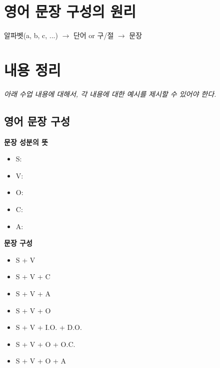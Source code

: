 \documentclass[11pt, twocolumn, a4paper]{oblivoir}
\begin{document}
    \chapter*{영어 문장 구성의 원리}

    
    알파벳(a, b, c, ...) $\rightarrow$ 단어 or 구/절 $\rightarrow$ 문장
    
    \chapter*{내용 정리}
   
  \noindent  \emph{아래 수업 내용에 대해서, 각 내용에 대한 예시를 제시할 수 있어야 한다. }

    \section*{영어 문장 구성}

    \textbf{문장 성분의 뜻}
    \begin{itemize}
        \item S:
        \item V:
        \item O:
        \item C:
        \item A:
    \end{itemize}

    \textbf{문장 구성}
    \begin{itemize}
        \item S + V
        \item S + V + C
        \item S + V + A
        \item S + V + O
        \item S + V + I.O. + D.O.
        \item S + V + O + O.C.
        \item S + V + O + A
    \end{itemize}

    \pagebreak
\end{document}
